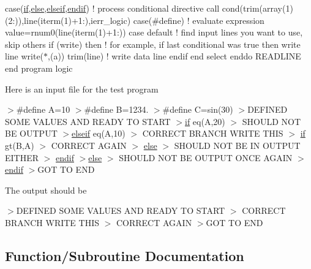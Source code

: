 case(\textquotesingle{}\hyperlink{namespacem__logic_a2229d0129ded7d8a34fce60334bc5938}{if}\textquotesingle{},\textquotesingle{}\hyperlink{namespacem__logic_ac51075acbd12f22ae97edd87352cba67}{else}\textquotesingle{},\textquotesingle{}\hyperlink{namespacem__logic_abb56458f58725800b593e986b23ec2d3}{elseif}\textquotesingle{},\textquotesingle{}\hyperlink{namespacem__logic_a60ae51929ab2f5d32f2a8f7e07e6debc}{endif}\textquotesingle{}) ! process conditional directive call cond(trim(array(1)(2\+:)),line(iterm(1)+1\+:),ierr\+\_\+logic) case(\textquotesingle{}\#define\textquotesingle{}) ! evaluate expression value=rnum0(line(iterm(1)+1\+:)) case default ! find input lines you want to use, skip others if (write) then ! for example, if last conditional was true then write line write($\ast$,\textquotesingle{}(a)\textquotesingle{}) trim(line) ! write data line endif end select enddo R\+E\+A\+D\+L\+I\+NE end program logic

Here is an input file for the test program

$>$\#define A=10 $>$\#define B=1234. $>$\#define C=sin(30) $>$D\+E\+F\+I\+N\+ED S\+O\+ME V\+A\+L\+U\+ES A\+ND R\+E\+A\+DY TO S\+T\+A\+RT $>$\hyperlink{namespacem__logic_a2229d0129ded7d8a34fce60334bc5938}{if} eq(\+A,20) $>$ S\+H\+O\+U\+LD N\+OT BE O\+U\+T\+P\+UT $>$\hyperlink{namespacem__logic_abb56458f58725800b593e986b23ec2d3}{elseif} eq(\+A,10) $>$ C\+O\+R\+R\+E\+CT B\+R\+A\+N\+CH W\+R\+I\+TE T\+H\+IS $>$ \hyperlink{namespacem__logic_a2229d0129ded7d8a34fce60334bc5938}{if} gt(\+B,\+A) $>$ C\+O\+R\+R\+E\+CT A\+G\+A\+IN $>$ \hyperlink{namespacem__logic_ac51075acbd12f22ae97edd87352cba67}{else} $>$ S\+H\+O\+U\+LD N\+OT BE IN O\+U\+T\+P\+UT E\+I\+T\+H\+ER $>$ \hyperlink{namespacem__logic_a60ae51929ab2f5d32f2a8f7e07e6debc}{endif} $>$\hyperlink{namespacem__logic_ac51075acbd12f22ae97edd87352cba67}{else} $>$ S\+H\+O\+U\+LD N\+OT BE O\+U\+T\+P\+UT O\+N\+CE A\+G\+A\+IN $>$\hyperlink{namespacem__logic_a60ae51929ab2f5d32f2a8f7e07e6debc}{endif} $>$G\+OT TO E\+ND

The output should be

$>$D\+E\+F\+I\+N\+ED S\+O\+ME V\+A\+L\+U\+ES A\+ND R\+E\+A\+DY TO S\+T\+A\+RT $>$ C\+O\+R\+R\+E\+CT B\+R\+A\+N\+CH W\+R\+I\+TE T\+H\+IS $>$ C\+O\+R\+R\+E\+CT A\+G\+A\+IN $>$G\+OT TO E\+ND 

\subsection{Function/\+Subroutine Documentation}
\mbox{\label{namespacem__logic_a169fe24f769ed7cd5336409c0722900e}} 
